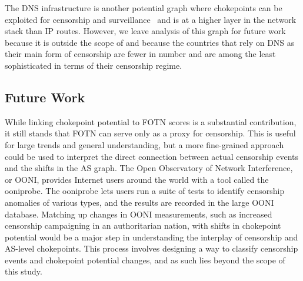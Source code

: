 The DNS infrastructure is another potential graph where chokepoints can be
exploited for censorship and surveillance~\cite{Greschbach2016a} and is at a
higher layer in the network stack than IP routes.  However, we leave analysis of
this graph for future work because it is outside the scope of \toolname{} and
because the countries that rely on DNS as their main form of censorship are
fewer in number and are among the least sophisticated in terms of their
censorship regime.

\subsection{Future Work}
While linking chokepoint potential to FOTN scores is a substantial contribution, it still stands that FOTN can serve only as a proxy for censorship.
This is useful for large trends and general understanding, but a more fine-grained approach could be used to interpret the direct connection between
actual censorship events and the shifts in the AS graph. The Open Observatory of Network Interference, or OONI, \cite{OONI} provides Internet users around
the world with a tool called the ooniprobe. The ooniprobe lets users run a suite of tests to identify censorship anomalies of various types, and the results are
recorded in the large OONI database. Matching up changes in OONI measurements, such as increased censorship campaigning in an authoritarian nation, with shifts
in chokepoint potential would be a major step in understanding the interplay of censorship and AS-level chokepoints. This process involves designing a way to classify
censorship events and chokepoint potential changes, and as such lies beyond the scope of this study.


